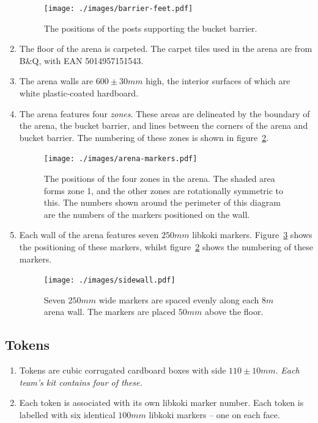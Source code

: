 \begin{enumerate}
  \begin{figure}
    \centering
    \texttt{[image: ./images/barrier-feet.pdf]}
    \caption{The positions of the posts supporting the bucket barrier.}
    \label{fig:bucket-barrier-legs}
  \end{figure}

\item The floor of the arena is carpeted.
      The carpet tiles used in the arena are from B\&Q, with EAN 5014957151543.

\item The arena walls are $600\pm30mm$ high, the interior surfaces of which are white plastic-coated hardboard.

\item The arena features four \textit{zones}.
      These areas are delineated by the boundary of the arena, the bucket barrier, and lines between the corners of the arena and bucket barrier.
      The numbering of these zones is shown in figure~\ref{fig:arena-zones}.

  \begin{figure}
    \centering
    \texttt{[image: ./images/arena-markers.pdf]}
    \caption{The positions of the four zones in the arena.
             The shaded area forms zone 1, and the other zones are rotationally symmetric to this.
             The numbers shown around the perimeter of this diagram are the numbers of the markers positioned on the wall.}
    \label{fig:arena-zones}
  \end{figure}

\item Each wall of the arena features seven $250mm$ libkoki markers.
      Figure~\ref{fig:arena-wall} shows the positioning of these markers, whilst figure~\ref{fig:arena-zones} shows the numbering of these markers.

  \begin{figure}
    \centering
    \texttt{[image: ./images/sidewall.pdf]}
    \caption{Seven $250mm$ wide markers are spaced evenly along each $8m$ arena wall.
             The markers are placed $50mm$ above the floor.}
    \label{fig:arena-wall}
  \end{figure}

\end{enumerate}

\subsection{Tokens}
\label{sub:Tokens}
\begin {enumerate}
\item Tokens are cubic corrugated cardboard boxes with side $110 \pm 10 mm$.
      \emph{Each team's kit contains four of these.}

\item Each token is associated with its own libkoki marker number.
      Each token is labelled with six identical $100mm$ libkoki markers -- one on each face.
\end {enumerate}

